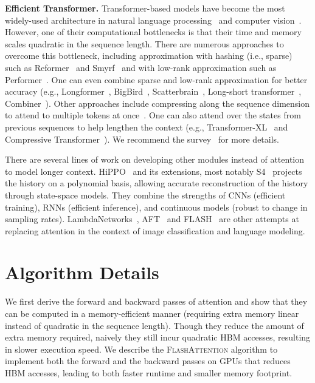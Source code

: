 \documentclass{article}
\newcommand{\sysname}{\textsc{FlashAttention}\xspace}
\begin{document}
\textbf{Efficient Transformer.}
Transformer-based models have become the most widely-used architecture in
natural language processing~\citep{devlin2018bert} and computer
vision~\citep{dosovitskiy2020image,yuan2021tokens}.
However, one of their computational bottlenecks is that their time and memory
scales quadratic in the sequence length.
There are numerous approaches to overcome this bottleneck, including
approximation with hashing (i.e., sparse) such as
Reformer~\citep{kitaev2020reformer} and Smyrf~\citep{daras2020smyrf} and with
low-rank approximation such as
Performer~\citep{choromanski2020rethinking,likhosherstov2020sub}.
One can even combine sparse and low-rank approximation for better accuracy
(e.g., Longformer~\citep{beltagy2020longformer},
BigBird~\citep{zaheer2020bigbird}, Scatterbrain~\citep{scatterbrain},
Long-short transformer~\citep{zhu2021long}, Combiner~\citep{ren2021combiner}).
Other approaches include compressing along the sequence dimension to attend to
multiple tokens at
once~\citep{wu2019pay,sukhbaatar2019adaptive,lan2019albert,ma2021luna}.
One can also attend over the states from previous sequences to help lengthen the
context (e.g., Transformer-XL~\citep{dai2019transformer} and Compressive
Transformer~\citep{rae2019compressive}).
We recommend the survey~\citep{tay2020efficient} for more details.

There are several lines of work on developing other modules instead of attention
to model longer context. HiPPO~\citep{gu2020hippo} and its extensions, most
notably S4~\citep{gu2021combining, gu2022efficiently, goel2022s} projects the
history on a polynomial basis, allowing accurate reconstruction of the history
through state-space models.
They combine the strengths of CNNs (efficient training), RNNs (efficient
inference), and continuous models (robust to change in sampling rates).
LambdaNetworks~\citep{bello2021lambdanetworks},  AFT~\citep{zhai2021attention}
and FLASH~\citep{hua2022transformer} are other attempts at replacing attention
in the context of image classification and language modeling.

\section{Algorithm Details}
\label{sec:algo_details}

We first derive the forward and backward passes of attention and show that
they can be computed in a memory-efficient manner (requiring extra memory linear
instead of quadratic in the sequence length).
Though they reduce the amount of extra memory required, naively they still incur
quadratic HBM accesses, resulting in slower execution speed.
We describe the \sysname algorithm to implement both the forward and the
backward passes on GPUs that reduces HBM accesses, leading to both faster
runtime and smaller memory footprint.
\end{document}
